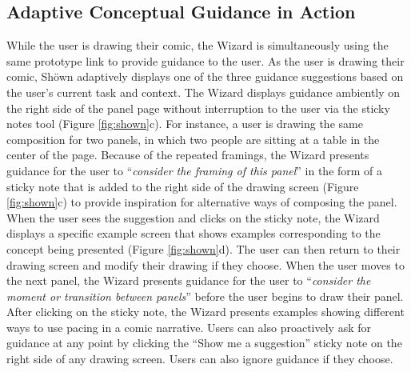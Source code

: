 \subsection{Adaptive Conceptual Guidance in Action}
While the user is drawing their comic, the Wizard is simultaneously using the same prototype link to provide guidance to the user. As the user is drawing their comic, Sh{\"o}wn adaptively displays one of the three guidance suggestions based on the user’s current task and context. The Wizard displays guidance ambiently \cite{matejka2011ambient} on the right side of the panel page without interruption to the user via the sticky notes tool (Figure \ref{fig:shown}c). For instance, a user is drawing the same composition for two panels, in which two people are sitting at a table in the center of the page. Because of the repeated framings, the Wizard presents guidance for the user to ``\textit{consider the framing of this panel}'' in the form of a sticky note that is added to the right side of the drawing screen (Figure \ref{fig:shown}c) to provide inspiration for alternative ways of composing the panel. When the user sees the suggestion and clicks on the sticky note, the Wizard displays a specific example screen that shows examples corresponding to the concept being presented (Figure \ref{fig:shown}d). The user can then return to their drawing screen and modify their drawing if they choose. When the user moves to the next panel, the Wizard presents guidance for the user to ``\textit{consider the moment or transition between panels}'' before the user begins to draw their panel. After clicking on the sticky note, the Wizard presents examples showing different ways to use pacing in a comic narrative. Users can also proactively ask for guidance at any point by clicking the ``Show me a suggestion'' sticky note on the right side of any drawing screen. Users can also ignore guidance if they choose.

